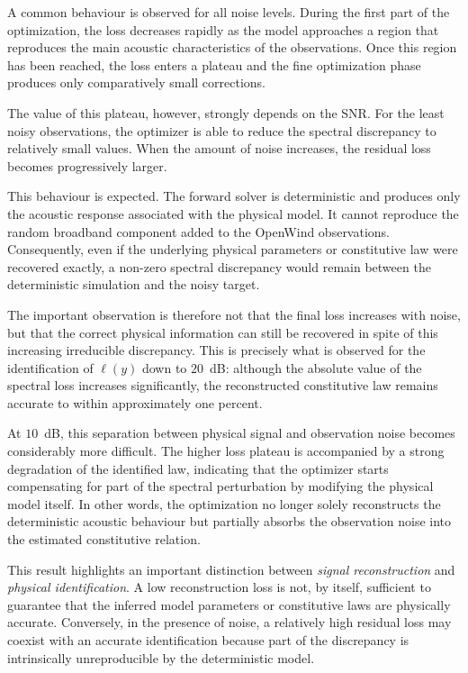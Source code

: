 \documentclass[11pt,a4paper]{report}
\theoremstyle{plain}
\theoremstyle{definition}
\begin{document}
A common behaviour is observed for all noise levels. During the first part of
the optimization, the loss decreases rapidly as the model approaches a region
that reproduces the main acoustic characteristics of the observations. Once
this region has been reached, the loss enters a plateau and the fine
optimization phase produces only comparatively small corrections.

The value of this plateau, however, strongly depends on the SNR. For the
least noisy observations, the optimizer is able to reduce the spectral
discrepancy to relatively small values. When the amount of noise increases,
the residual loss becomes progressively larger.

This behaviour is expected. The forward solver is deterministic and produces
only the acoustic response associated with the physical model. It cannot
reproduce the random broadband component added to the OpenWind observations.
Consequently, even if the underlying physical parameters or constitutive law
were recovered exactly, a non-zero spectral discrepancy would remain between
the deterministic simulation and the noisy target.

The important observation is therefore not that the final loss increases with
noise, but that the correct physical information can still be recovered in
spite of this increasing irreducible discrepancy. This is precisely what is
observed for the identification of $\ell(y)$ down to $20$~dB: although the
absolute value of the spectral loss increases significantly, the reconstructed
constitutive law remains accurate to within approximately one percent.

At $10$~dB, this separation between physical signal and observation noise
becomes considerably more difficult. The higher loss plateau is accompanied by
a strong degradation of the identified law, indicating that the optimizer
starts compensating for part of the spectral perturbation by modifying the
physical model itself. In other words, the optimization no longer solely
reconstructs the deterministic acoustic behaviour but partially absorbs the
observation noise into the estimated constitutive relation.

This result highlights an important distinction between \emph{signal
reconstruction} and \emph{physical identification}. A low reconstruction loss
is not, by itself, sufficient to guarantee that the inferred model parameters
or constitutive laws are physically accurate. Conversely, in the presence of
noise, a relatively high residual loss may coexist with an accurate
identification because part of the discrepancy is intrinsically
unreproducible by the deterministic model.
\end{document}
